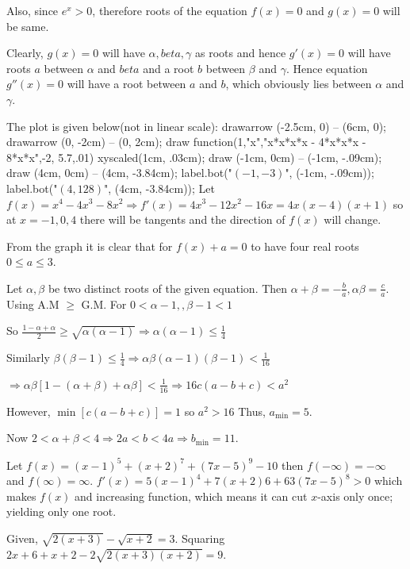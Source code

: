   Also, since $e^x > 0$, therefore roots of the equation $f(x) = 0$ and $g(x) = 0$ will be same.

  Clearly, $g(x) = 0$ will have $\alpha, beta, \gamma$ as roots and hence $g'(x) = 0$ will have roots $a$
  between $\alpha$ and $beta$ and a root $b$ between $\beta$ and $\gamma$. Hence equation $g''(x) = 0$ will
  have a root between $a$ and $b$, which obviously lies between $\alpha$ and $\gamma$.
\item The plot is given below(not in linear scale):
  \startplacefigure[location={middle,none}]
    \startMPcode
      drawarrow (-2.5cm, 0) -- (6cm, 0);
      drawarrow (0, -2cm) -- (0, 2cm);
      draw function(1,"x","x*x*x*x - 4*x*x*x - 8*x*x",-2, 5.7,.01) xyscaled(1cm, .03cm);
      draw (-1cm, 0cm) -- (-1cm, -.09cm);
      draw (4cm, 0cm) -- (4cm, -3.84cm);
      label.bot("$(-1, -3)$", (-1cm, -.09cm));
      label.bot("$(4, 128)$", (4cm, -3.84cm));
    \stopMPcode
  \stopplacefigure
  Let $f(x) = x^4 - 4x^3 - 8x^2 \Rightarrow f'(x) = 4x^3 - 12x^2 - 16x = 4x(x - 4)(x + 1)$ so at $x =
  -1, 0, 4$ there will be tangents and the direction of $f(x)$ will change.

  From the graph it is clear that for $f(x) + a = 0$ to have four real roots $0\leq a\leq 3$.
\item Let $\alpha, \beta$ be two distinct roots of the given equation. Then $\alpha + \beta = -\frac{b}{a},
  \alpha\beta = \frac{c}{a}$. Using A.M $\geq$ G.M. For $0 < \alpha - 1,, \beta - 1 < 1$

  So $\frac{1 - \alpha + \alpha}{2}\geq\sqrt{\alpha(\alpha - 1)} \Rightarrow \alpha(\alpha - 1)\leq
  \frac{1}{4}$

  Similarly $\beta(\beta - 1)\leq \frac{1}{4}\Rightarrow \alpha\beta(\alpha - 1)(\beta - 1)< \frac{1}{16}$

  $\Rightarrow \alpha\beta[1 - (\alpha + \beta) + \alpha\beta] < \frac{1}{16}\Rightarrow 16c(a - b + c) <
  a^2$

  However, $\min[c(a - b + c)] = 1$ so $a^2 > 16$ Thus, $a_{\min} = 5$.

  Now $2 < \alpha + \beta < 4 \Rightarrow 2a < b < 4a \Rightarrow b_{\min} = 11$.
\item Let $f(x) = (x - 1)^5 + (x + 2)^7 + (7x - 5)^9 - 10$ then $f(-\infty) = -\infty$ and $f(\infty) =
  \infty$. $f'(x) = 5(x - 1)^4 + 7(x + 2)6 + 63(7x - 5)^8 > 0$ which makes $f(x)$ and increasing function,
  which means it can cut $x$-axis only once; yielding only one root.
\item Given, $\sqrt{2(x + 3)} - \sqrt{x + 2} = 3$. Squaring $2x + 6 + x + 2 - 2\sqrt{2(x + 3)(x + 2)} = 9$.

